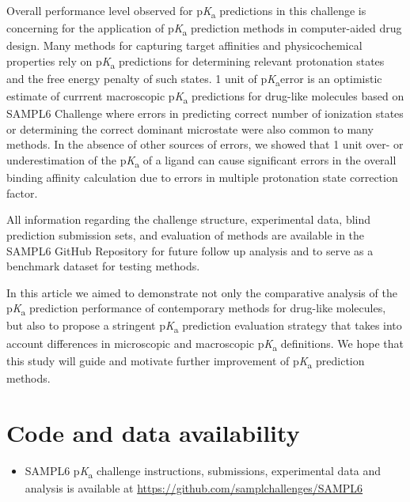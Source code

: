 \documentclass[9pt,lineno,final]{elife}
\newcommand{\pKa}{p\textit{K}\textsubscript{a}}
\begin{document}
Overall performance level observed for \pKa{} predictions in this challenge is concerning for the application of \pKa{} prediction methods in computer-aided drug design. Many methods for capturing target affinities and physicochemical properties rely on \pKa{} predictions for determining relevant protonation states and the free energy penalty of such states. 1 unit of \pKa error is an optimistic estimate of currrent macroscopic \pKa{} predictions for drug-like molecules based on SAMPL6 Challenge where errors in predicting correct number of ionization states or determining the correct dominant microstate were also common to many methods. In the absence of other sources of errors, we showed that 1 unit over- or underestimation of the \pKa{} of a ligand can cause significant errors in the overall binding affinity calculation due to errors in multiple protonation state correction factor. 

All information regarding the challenge structure, experimental data, blind prediction submission sets, and evaluation of methods are available in the SAMPL6 GitHub Repository for future follow up analysis and to serve as a benchmark dataset for testing methods. 

In this article we aimed to demonstrate not only the comparative analysis of the \pKa{} prediction performance of contemporary methods for drug-like molecules, but also to propose a stringent \pKa{} prediction evaluation strategy that takes into account differences in microscopic and macroscopic \pKa{} definitions. We hope that this study will guide and motivate further improvement of \pKa{} prediction methods.


\section{Code and data availability} \label{Code-and-Data-Availability}
\begin{minipage}{15cm}
\begin{itemize}

\item SAMPL6 \pKa{} challenge instructions, submissions, experimental data and analysis is available at  \href{https://github.com/samplchallenges/SAMPL6}{https://github.com/samplchallenges/SAMPL6}

\end{itemize}
\end{minipage}
\end{document}
